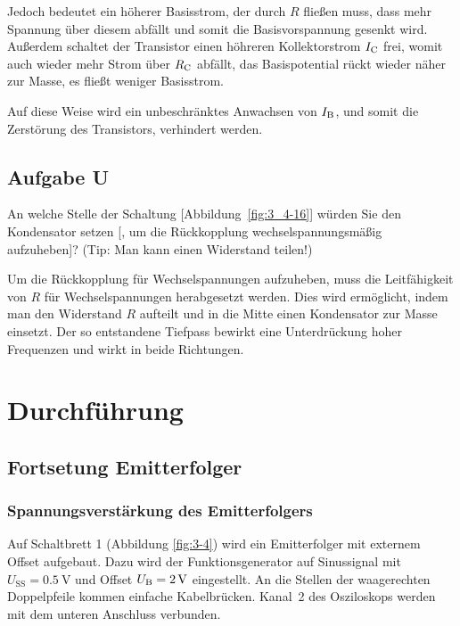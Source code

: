 Jedoch bedeutet ein höherer Basisstrom, der durch $R$ fließen muss, dass mehr
Spannung über diesem abfällt und somit die Basisvorspannung gesenkt wird.
Außerdem schaltet der Transistor einen höhreren Kollektorstrom $\IC$ frei,
womit auch wieder mehr Strom über $\RC$ abfällt, das Basispotential rückt
wieder näher zur Masse, es fließt weniger Basisstrom.

Auf diese Weise wird ein unbeschränktes Anwachsen von $\IB$, und somit die
Zerstörung des Transistors, verhindert werden.

\FloatBarrier
\subsection{Aufgabe U}

\begin{problem}
	An welche Stelle der Schaltung [Abbildung~\ref{fig:3_4-16}] würden Sie den
	Kondensator setzen [, um die Rückkopplung wechselspannungsmäßig
	aufzuheben]? (Tip: Man kann einen Widerstand teilen!)
\end{problem}

Um die Rückkopplung für Wechselspannungen aufzuheben, muss die Leitfähigkeit
von $R$ für Wechselspannungen herabgesetzt werden. Dies wird ermöglicht, indem
man den Widerstand $R$ aufteilt und in die Mitte einen Kondensator zur Masse
einsetzt. Der so entstandene Tiefpass bewirkt eine Unterdrückung hoher
Frequenzen und wirkt in beide Richtungen.


\FloatBarrier
\section{Durchführung}

\subsection{Fortsetung Emitterfolger}

\subsubsection{Spannungsverstärkung des Emitterfolgers}

Auf Schaltbrett 1 (Abbildung \ref{fig:3-4}) wird ein Emitterfolger mit
externem Offset aufgebaut. Dazu wird der Funktionsgenerator auf Sinussignal mit
$U_\text{SS} = \SI{0.5}{\volt}$ und Offset $\UB = \SI 2{\volt}$ eingestellt. An
die Stellen der waagerechten Doppelpfeile kommen einfache Kabelbrücken. Kanal~2
des Osziloskops werden mit dem unteren Anschluss verbunden.

